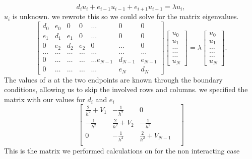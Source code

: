\documentclass[%
reprint,
superscriptaddress,
showpacs,
nofootinbib,
bibnotes,amsmath,amssymb,aps,
prc, 
]{revtex4-1}
\begin{document}
\begin{equation*}
	d_iu_i+e_{i-1}u_{i-1}+e_{i+1}u_{i+1}  = \lambda u_i,
\end{equation*}
$u_i$ is unknown. we rewrote this so we could solve for the matrix eigenvalues.
\begin{equation}
\begin{bmatrix}d_0 & e_0 & 0   & 0    & \dots  &0     & 0 \\
e_1 & d_1 & e_1 & 0    & \dots  &0     &0 \\
0   & e_2 & d_2 & e_2  &0       &\dots & 0\\
\dots  & \dots & \dots & \dots  &\dots      &\dots & \dots\\
0   & \dots & \dots & \dots  &\dots  e_{N-1}     &d_{N-1} & e_{N-1}\\
0   & \dots & \dots & \dots  &\dots       &e_{N} & d_{N}
\end{bmatrix}  \begin{bmatrix} u_{0} \\
u_{1} \\
\dots\\ \dots\\ \dots\\
u_{N}
\end{bmatrix}=\lambda \begin{bmatrix} u_{0} \\
u_{1} \\
\dots\\ \dots\\ \dots\\
u_{N}
\end{bmatrix}.  
\label{eq:sematrix}
\end{equation}
The values of $u$ at the two endpoints are known through the boundary conditions, allowing us to skip the involved rows and columns. we specified the matrix with our values for $d_i$ and $e_i$
\begin{equation}
\begin{bmatrix} \frac{2}{h^2}+V_1 & -\frac{1}{h^2} & 0        \\
-\frac{1}{h^2} & \frac{2}{h^2}+V_2 & -\frac{1}{h^2}     \\
0   & -\frac{1}{h^2} & \frac{2}{h^2}+V_{N-1} &     \\

\end{bmatrix}
\label{eq:matrixse} 
\end{equation}
This is the matrix we performed calculations on for the non interacting case
\end{document}
